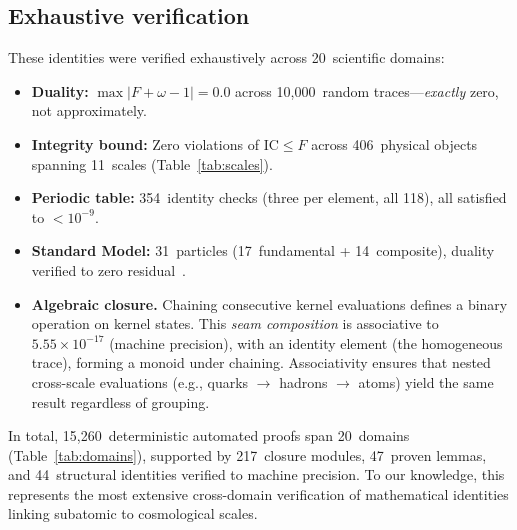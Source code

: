 \documentclass[11pt]{article}
\newcommand{\IC}{\mathrm{IC}}
\begin{document}
\subsection{Exhaustive verification}

These identities were verified exhaustively across
20~scientific domains:

\begin{itemize}[leftmargin=1.5em,itemsep=2pt]
\item \textbf{Duality:} $\max|F + \omega - 1| = 0.0$
  across 10{,}000~random traces---\emph{exactly} zero, not
  approximately.
\item \textbf{Integrity bound:} Zero violations of $\IC \leq F$
  across 406~physical objects spanning 11~scales
  (Table~\ref{tab:scales}).
\item \textbf{Periodic table:} 354~identity checks (three per
  element, all 118), all satisfied to $< 10^{-9}$.
\item \textbf{Standard Model:} 31~particles (17~fundamental +
  14~composite), duality verified to zero
  residual~\cite{pdg2024}.
\item \textbf{Algebraic closure.} Chaining consecutive kernel
  evaluations defines a binary operation on kernel states.
  This \emph{seam composition} is associative to
  $5.55 \times 10^{-17}$ (machine precision), with an identity
  element (the homogeneous trace), forming a
  monoid under chaining. Associativity ensures that nested
  cross-scale evaluations (e.g., quarks $\to$ hadrons $\to$ atoms)
  yield the same result regardless of grouping.
\end{itemize}

In total, 15{,}260~deterministic automated proofs span
20~domains (Table~\ref{tab:domains}), supported by
217~closure modules, 47~proven lemmas, and 44~structural
identities verified to machine precision. To our knowledge,
this represents the most extensive cross-domain verification
of mathematical identities linking subatomic to cosmological
scales.
\end{document}
